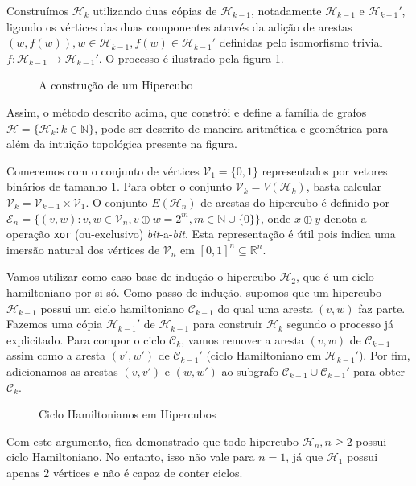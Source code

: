 \documentclass{homework}
\begin{document}
\begin{enumerate}[label=\textbf{\arabic*)}]
	Construímos $\mathscr{H}_k$ utilizando duas cópias de $\mathscr{H}_{k-1}$, notadamente $\mathscr{H}_{k-1}$ e $\mathscr{H}_{k-1}'$, ligando os vértices das duas componentes através da adição de arestas $(w, f(w)), w \in \mathscr{H}_{k-1}, f(w) \in \mathscr{H}_{k-1}'$ definidas pelo isomorfismo trivial $f:\mathscr{H}_{k-1}\to\mathscr{H}_{k-1}'$. O processo é ilustrado pela figura \ref{fig:1.6.1}. \par

	\begin{figure}[H]
		\centering
		
		\caption{A construção de um Hipercubo}
		\label{fig:1.6.1}
	\end{figure}

	Assim, o método descrito acima, que constrói e define a família de grafos $\mathscr{H} = \{\mathscr{H}_{k} : k \in \mathbb{N}\}$, pode ser descrito de maneira aritmética e geométrica para além da intuição topológica presente na figura.\par
	
	Comecemos com o conjunto de vértices $\mathscr{V}_1 = \{0, 1\}$ representados por vetores binários de tamanho $1$. Para obter o conjunto $\mathscr{V}_k = V(\mathscr{H}_k)$, basta calcular $\mathscr{V}_k = \mathscr{V}_{k-1} \times \mathscr{V}_1$. O conjunto $E(\mathscr{H}_n)$ de arestas do hipercubo é definido por $\mathscr{E}_n = \{(v, w) : v, w \in \mathscr{V}_n, v \oplus w = 2^{m}, m \in \mathbb{N} \cup \{0\}\}$, onde $x \oplus y$ denota a operação \texttt{xor} (ou-exclusivo) \textit{bit}-a-\textit{bit}. Esta representação é útil pois indica uma imersão natural dos vértices de $\mathscr{V}_n$ em $[0, 1]^{n} \subseteq\mathbb{R}^n$.\par

	Vamos utilizar como caso base de indução o hipercubo $\mathscr{H}_2$, que é um ciclo hamiltoniano por si só. Como passo de indução, supomos que um hipercubo $\mathscr{H}_{k-1}$ possui um ciclo hamiltoniano $\mathscr{C}_{k-1}$ do qual uma aresta $(v, w)$ faz parte. Fazemos uma cópia $\mathscr{H}_{k-1}'$ de $\mathscr{H}_{k-1}$ para construir $\mathscr{H}_{k}$ segundo o processo já explicitado. Para compor o ciclo $\mathscr{C}_k$, vamos remover a aresta $(v, w)$ de $\mathscr{C}_{k-1}$ assim como a aresta $(v', w')$ de $\mathscr{C}_{k-1}'$ (ciclo Hamiltoniano em $\mathscr{H}_{k-1}'$). Por fim, adicionamos as arestas $(v, v')$ e $(w, w')$ ao subgrafo $\mathscr{C}_{k-1} \cup \mathscr{C}_{k-1}'$ para obter $\mathscr{C}_{k}$. \par

	\begin{figure}[H]
		\centering
		
		\caption{Ciclo Hamiltonianos em Hipercubos}
		\label{fig:1.6.2}
	\end{figure}
	
	Com este argumento, fica demonstrado que todo hipercubo $\mathscr{H}_{n}, n \ge 2$ possui ciclo Hamiltoniano. No entanto, isso não vale para $n = 1$, já que $\mathscr{H}_{1}$ possui apenas $2$ vértices e não é capaz de conter ciclos. \par

	\end{enumerate}
\end{document}

